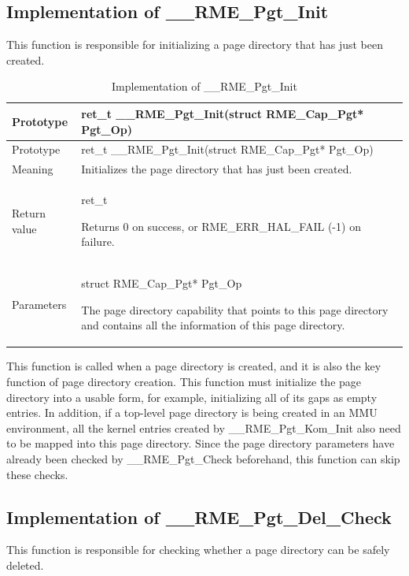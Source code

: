 \subsection{Implementation of \_\_RME\_Pgt\_Init}\label{subsec:7-rme-pgt-init-implementation}

This function is responsible for initializing a page directory that has just been created.

\begin{xltabular}{\textwidth}{@{}>{\hsize\raggedright\arraybackslash}X>{\hsize\raggedright\arraybackslash}X@{}}
\caption{Implementation of \_\_RME\_Pgt\_Init}\label{tab:7-77-rme-pgt-init-implementation}\\
\toprule
Prototype & ret\_t \_\_RME\_Pgt\_Init(struct RME\_Cap\_Pgt*
Pgt\_Op)\tabularnewline
\endfirsthead
\toprule
Prototype & ret\_t \_\_RME\_Pgt\_Init(struct RME\_Cap\_Pgt*
Pgt\_Op)\tabularnewline
\midrule
\endhead
\bottomrule
\endlastfoot
Meaning & Initializes the page directory that has just been created.\tabularnewline
Return value\strut
 & ret\_t

Returns 0 on success, or RME\_ERR\_HAL\_FAIL (-1) on failure.\strut
\tabularnewline
Parameters\strut
 & struct RME\_Cap\_Pgt* Pgt\_Op

The page directory capability that points to this page directory and contains all the information of this page directory.\strut
\tabularnewline
\end{xltabular}
\nopagebreak[4]

This function is called when a page directory is created, and it is also the key function of page directory creation. This function must initialize the page directory into a usable form, for example, initializing all of its gaps as empty entries. In addition, if a top-level page directory is being created in an MMU environment, all the kernel entries created by \_\_RME\_Pgt\_Kom\_Init also need to be mapped into this page directory. Since the page directory parameters have already been checked by \_\_RME\_Pgt\_Check beforehand, this function can skip these checks.

\subsection{Implementation of \_\_RME\_Pgt\_Del\_Check}\label{subsec:7-rme-pgt-del-check-implementation}

This function is responsible for checking whether a page directory can be safely deleted.

